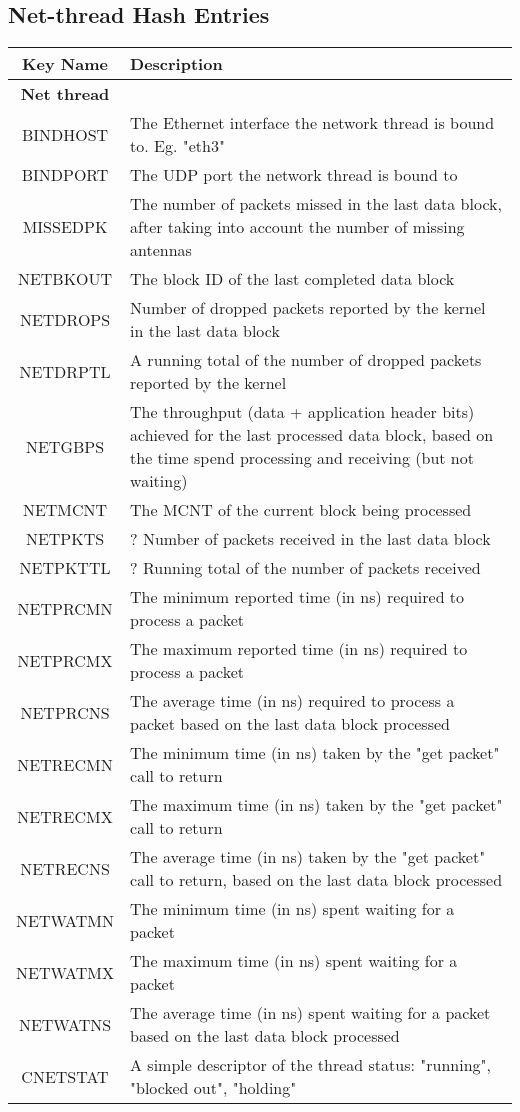\documentclass{article}
\begin{document}
\subsection{Net-thread Hash Entries}

\begin{centering}
\begin{tabular}{c p{}}
\hline
Key Name & Description \\
\hline
\hline
\textbf{Net thread} & \\
BINDHOST & The Ethernet interface the network thread is bound to. Eg. "eth3" \\
BINDPORT & The UDP port the network thread is bound to \\
MISSEDPK & The number of packets missed in the last data block, after taking into account the number of missing antennas \\
NETBKOUT & The block ID of the last completed data block \\
NETDROPS & Number of dropped packets reported by the kernel in the last data block \\
NETDRPTL & A running total of the number of dropped packets reported by the kernel \\
NETGBPS  & The throughput (data + application header bits) achieved for the last processed data block, based on the time spend processing and receiving (but not waiting) \\
NETMCNT  & The MCNT of the current block being processed \\
NETPKTS  & ? Number of packets received in the last data block\\
NETPKTTL & ? Running total of the number of packets received \\
NETPRCMN & The minimum reported time (in ns) required to process a packet \\
NETPRCMX & The maximum reported time (in ns) required to process a packet \\
NETPRCNS & The average time (in ns) required to process a packet based on the last data block processed \\
NETRECMN & The minimum time (in ns) taken by the "get packet" call to return \\
NETRECMX & The maximum time (in ns) taken by the "get packet" call to return \\
NETRECNS & The average time (in ns) taken by the "get packet" call to return, based on the last data block processed \\
NETWATMN & The minimum time (in ns) spent waiting for a packet \\
NETWATMX & The maximum time (in ns) spent waiting for a packet \\
NETWATNS & The average time (in ns) spent waiting for a packet based on the last data block processed \\
CNETSTAT  & A simple descriptor of the thread status: "running", "blocked out", "holding" \\
\end{tabular}
\end{centering}
\end{document}
